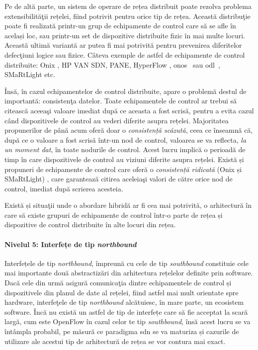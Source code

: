 Pe de altă parte, un sistem de operare de rețea distribuit poate rezolva problema extensibilităţii rețelei, fiind potrivit pentru orice tip de rețea. Această distribuţie poate fi realizată printr-un grup de echipamente de control care să se afle în același loc, sau printr-un set de dispozitive distribuite fizic în mai multe locuri. Această ultimă variantă ar putea fi mai potrivită pentru prevenirea diferitelor defecţiuni logice sau fizice. Câteva exemple de astfel de echipamente de control distribuite: Onix \cite{koponen2010onix}, HP VAN SDN, PANE, HyperFlow \cite{tootoonchian2010hyperflow}, \gls{onos}~\cite{berde2014onos} sau \gls{odl}~\cite{medved2014opendaylight}, SMaRtLight \cite{botelho2014smartlight} etc.

Însă, în cazul echipamentelor de control distribuite, apare o problemă destul de importantă: consistenţa datelor. Toate echipamentele de control ar trebui să citească aceeaşi valoare imediat după ce aceasta a fost scrisă, pentru a evita cazul când dispozitivele de control au vederi diferite asupra rețelei. Majoritatea propunerilor de până acum oferă doar o \textit{consistență scăzută}, ceea ce înseamnă că, după ce o valoare a fost scrisă într-un nod de control, valoarea se va reflecta, \textit{la un moment dat}, în toate nodurile de control. Acest lucru implică o perioadă de timp în care dispozitivele de control au viziuni diferite asupra rețelei. Există și propuneri de echipamente de control care oferă o \textit{consistență ridicată} (Onix și SMaRtLight) \cite{koponen2010onix, botelho2014smartlight}, care garantează citirea aceleiaşi valori de către orice nod de control, imediat după scrierea acesteia.

Există și situaţii unde o abordare hibridă ar fi cea mai potrivită, o arhitectură în care să existe grupuri de echipamente de control într-o parte de rețea și dispozitive de control distribuite în alte locuri din rețea.

\paragraph{Nivelul 5: Interfețe de tip \textit{northbound}}

Interfețele de tip \textit{northbound}, împreună cu cele de tip \textit{southbound} constituie cele mai importante două abstractizări din arhitectura rețelelor definite prin software. Dacă cele din urmă asigură comunicaţia dintre echipamentele de control și dispozitivele din planul de date al rețelei, fiind astfel mai mult orientate spre hardware, interfeţele de tip \textit{northbound} alcătuiesc, în mare parte, un ecosistem software. Încă nu există un astfel de tip de interfețe care să fie acceptat la scară largă, cum este OpenFlow în cazul celor te tip \textit{southbound}, însă acest lucru se va întâmpla probabil, pe măsură ce paradigma \gls{sdn} se va maturiza și cazurile de utilizare ale acestui tip de arhitectură de rețea se vor contura mai exact.

